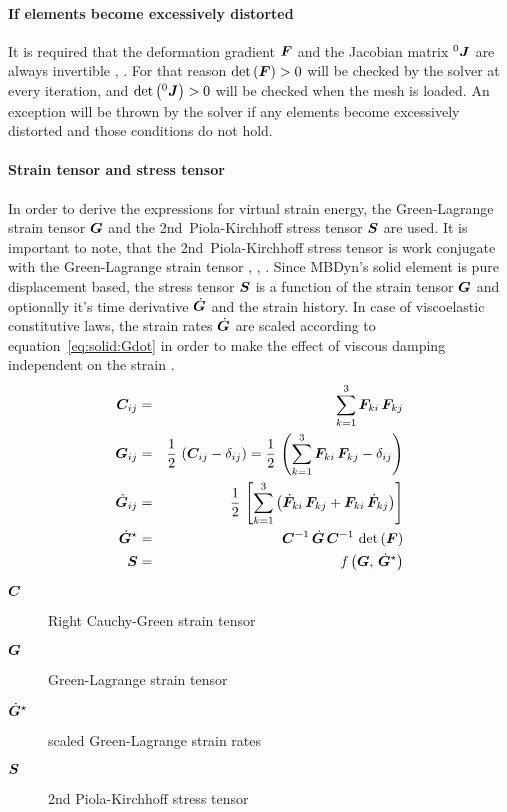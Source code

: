 \paragraph{If elements become excessively distorted}
It is required that the deformation gradient $\bm{F}$ and the Jacobian matrix ${^0}\bm{J}$ are always invertible \cite{BATHE2016}, \cite{KUEBLER2005}.
For that reason $\det{\left(\bm{F}\right)}>0$ will be checked by the solver at every iteration, and $\det{\left({^0}\bm{J}\right)}>0$ will be checked
when the mesh is loaded. An exception will be thrown by the solver if any elements become excessively distorted and those conditions do not hold.

\paragraph{Strain tensor and stress tensor}
In order to derive the expressions for virtual strain energy, the Green-Lagrange strain tensor $\bm{G}$ and the 2nd~Piola-Kirchhoff stress tensor $\bm{S}$ are used.
It is important to note, that the 2nd~Piola-Kirchhoff stress tensor is work conjugate with the Green-Lagrange strain tensor \cite{WALLRAPP1998}, \cite{BATHE2016}, \cite{KUEBLER2005}.
Since MBDyn's solid element is pure displacement based, the stress tensor $\bm{S}$ is a function of the strain tensor $\bm{G}$ and optionally it's time derivative $\dot{\bm{G}}$ and the strain history.
In case of viscoelastic constitutive laws, the strain rates $\dot{\bm{G}}$ are scaled according to equation~\ref{eq:solid:Gdot} in order to make the effect of viscous damping independent on the strain \cite{KUEBLER2005}.
\begin{eqnarray}
\bm{C}_{ij} & = & \sum_{k=1}^3\bm{F}_{ki}\,\bm{F}_{kj} \\
\bm{G}_{ij} & = & \frac{1}{2} \, \left(\bm{C}_{ij} - \delta_{ij} \right) = \frac{1}{2} \, \left(\sum_{k=1}^3\bm{F}_{ki}\,\bm{F}_{kj} - \delta_{ij}\right) \label{eq:solid:G} \\
\dot{\bm{G}}_{ij} & = & \frac{1}{2} \, \left[\sum_{k=1}^3\left(\dot{\bm{F}}_{ki}\,\bm{F}_{kj} + \bm{F}_{ki}\,\dot{\bm{F}}_{kj} \right)\right] \\
\dot{\bm{G}}^{\star} & = & \bm{C}^{-1} \, \dot{\bm{G}} \, \bm{C}^{-1} \, \det{\left(\bm{F}\right)} \label{eq:solid:Gdot} \\
\bm{S} & = & \mathit{f}\left(\bm{G}, \, \dot{\bm{G}}^{\star}\right)
\end{eqnarray}

\begin{description}
\item[$\bm{C}$] Right Cauchy-Green strain tensor
\item[$\bm{G}$] Green-Lagrange strain tensor
\item[$\dot{\bm{G}}^{\star}$] scaled Green-Lagrange strain rates
\item[$\bm{S}$] 2nd Piola-Kirchhoff stress tensor
\end{description}

